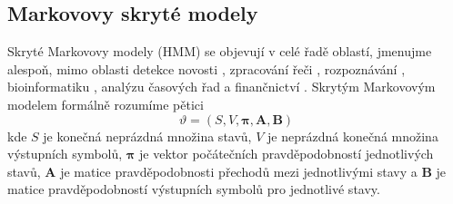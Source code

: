 \subsection{Markovovy skryté modely}
Skryté Markovovy modely (HMM) se objevují v celé řadě oblastí, jmenujme alespoň, mimo oblasti detekce novosti \cite{markou1,pimentel}, zpracování řeči \cite{hmm4}, rozpoznávání \cite{hmm3}, bioinformatiku \cite{hmm5}, analýzu časových řad \cite{hmm1} a finančnictví \cite{hmm2}. Skrytým Markovovým modelem formálně rozumíme pětici 
\begin{equation}
\vartheta=(S,V,\boldsymbol{\pi},\boldsymbol{A},\boldsymbol{B})
\end{equation}
kde $S$ je konečná neprázdná množina stavů, $V$ je neprázdná konečná množina výstupních symbolů, $\boldsymbol{\pi}$ je vektor počátečních pravděpodobností jednotlivých stavů, $\boldsymbol{A}$ je matice pravděpodobnosti přechodů mezi jednotlivými stavy a $\boldsymbol{B}$ je matice pravděpodobností výstupních symbolů pro jednotlivé stavy.
\par
